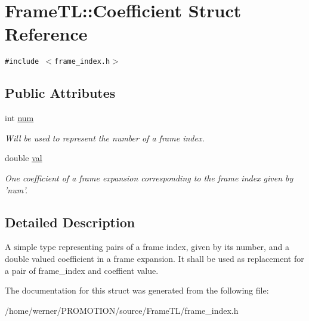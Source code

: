 \hypertarget{structFrameTL_1_1Coefficient}{
\section{FrameTL::Coefficient Struct Reference}
\label{structFrameTL_1_1Coefficient}
}
{\tt \#include $<$frame\_\-index.h$>$}

\subsection*{Public Attributes}
\begin{CompactItemize}
\item 
\hypertarget{structFrameTL_1_1Coefficient_cffca2b027806c7b010ece103a1e63b2}{
int \hyperlink{structFrameTL_1_1Coefficient_cffca2b027806c7b010ece103a1e63b2}{num}}
\label{structFrameTL_1_1Coefficient_cffca2b027806c7b010ece103a1e63b2}

\begin{CompactList}\small\item\em Will be used to represent the number of a frame index. \item\end{CompactList}\item 
\hypertarget{structFrameTL_1_1Coefficient_a0e2160c3b1f0593a875a109bca1444a}{
double \hyperlink{structFrameTL_1_1Coefficient_a0e2160c3b1f0593a875a109bca1444a}{val}}
\label{structFrameTL_1_1Coefficient_a0e2160c3b1f0593a875a109bca1444a}

\begin{CompactList}\small\item\em One coefficient of a frame expansion corresponding to the frame index given by 'num'. \item\end{CompactList}\end{CompactItemize}


\subsection{Detailed Description}
A simple type representing pairs of a frame index, given by its number, and a double valued coefficient in a frame expansion. It shall be used as replacement for a pair of frame\_\-index and coeffient value. 

The documentation for this struct was generated from the following file:\begin{CompactItemize}
\item 
/home/werner/PROMOTION/source/FrameTL/frame\_\-index.h\end{CompactItemize}
